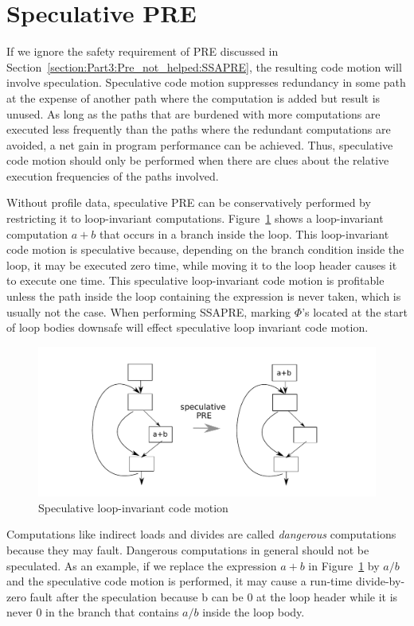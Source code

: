 \section{Speculative PRE}

If we ignore the safety requirement of PRE discussed in 
Section~\ref{section:Part3:Pre_not_helped:SSAPRE}, the resulting code motion
will involve speculation.  Speculative code motion suppresses
redundancy in some path at the expense of another path where the computation 
is added but result is unused.  As long as the paths that are burdened with
more computations are executed less frequently than the paths where the
redundant computations are avoided, a net gain in program performance can be
achieved.  Thus, speculative code motion should only be performed when there
are clues about the relative execution frequencies of the paths involved.

Without profile data, speculative PRE can be conservatively performed by
restricting it to loop-invariant computations.  
Figure~\ref{fig: spec-pre} shows
a loop-invariant computation $a+b$ that occurs in a branch inside the loop.
This loop-invariant code motion is speculative because, depending on the
branch condition inside the loop, it may be executed zero time, while moving it
to the loop header causes it to execute one time. This speculative 
loop-invariant code motion is profitable unless the path inside the loop
containing the expression is never taken, which is usually not the case.
When performing SSAPRE, marking $\Phi$'s located at the start of loop bodies
downsafe will effect speculative loop invariant code motion. 

\begin{figure}
\centering
\includegraphics[scale=0.55]{fig-spec-pre.pdf}
\caption{Speculative loop-invariant code motion}
\label{fig: spec-pre}
\end{figure}

Computations like indirect loads and divides are called \emph{dangerous}
computations because they may fault.  Dangerous computations in general should
not be speculated.
As an example, if we replace the expression $a+b$ in Figure~\ref{fig: spec-pre}
by $a/b$ and the speculative code motion is performed, it may cause a run-time
divide-by-zero fault after the speculation because b can be $0$ at the 
loop header while it is never $0$ in the branch that contains $a/b$ inside the 
loop body.


